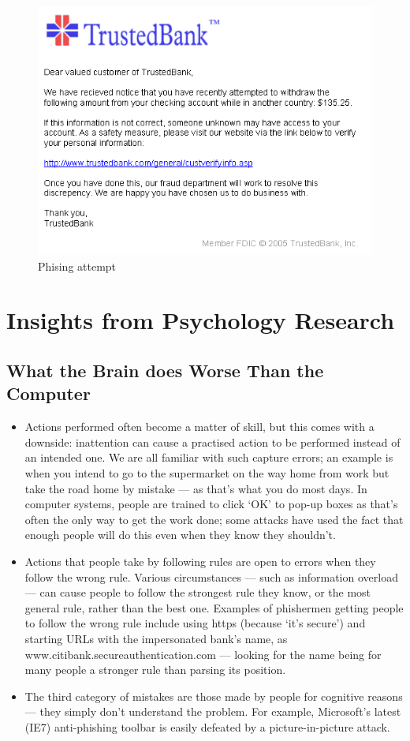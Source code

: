	\begin{figure}[H]
		\includegraphics[width=\textwidth]{pics/phishing.png}
		\caption{Phising attempt}
	\end{figure}

\clearpage
\section{Insights from Psychology Research}
	
	\subsection*{What the Brain does Worse Than the Computer}
	\begin{itemize}
		\item Actions performed often become a matter of skill, but this comes with
		a downside: inattention can cause a practised action to be performed
		instead of an intended one. We are all familiar with such capture errors;
		an example is when you intend to go to the supermarket on the way home from 
		work but take the road home by mistake — as that’s what you do most days. 
		In computer systems, people are trained to click ‘OK’ to pop-up boxes as that’s 
		often the only way to get the work done; some attacks have used the fact that 
		enough people will do this even when they know they shouldn’t.
		\item Actions that people take by following rules are open to errors when 
		they follow the wrong rule. Various circumstances — such as information overload 
		— can cause people to follow the strongest rule they know, or the most general rule, 
		rather than the best one. Examples of phishermen getting people to follow the wrong 
		rule include using https (because ‘it’s secure’) and starting URLs with the 
		impersonated bank’s name, as www.citibank.secureauthentication.com — 
		looking for the name being for many people a stronger rule than parsing its position.
		\item The third category of mistakes are those made by people for cognitive
		reasons — they simply don’t understand the problem. For example, Microsoft’s latest 
		(IE7) anti-phishing toolbar is easily defeated by a picture-in-picture attack. 
	\end{itemize}

